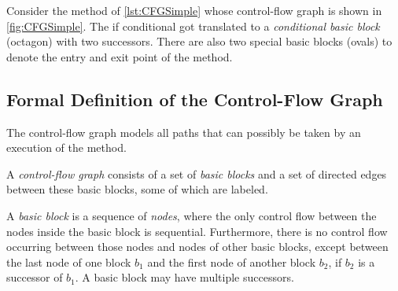
Consider the method  of \autoref{lst:CFGSimple} whose control-flow
graph is shown in \autoref{fig:CFGSimple}. The if conditional got translated to
a \emph{conditional basic block} (octagon) with two successors. There are also two
special basic blocks (ovals) to denote the entry and exit point of the method.


\subsection{Formal Definition of the Control-Flow Graph}
\label{sec:cfg-formal}

The control-flow graph models all paths that can possibly be taken by an
execution of the method.

\begin{definition}
    A \emph{control-flow graph} consists of a set of \emph{basic blocks} and
    a set of directed edges between these basic blocks, some of which are labeled.
\end{definition}

\begin{definition}
    A \emph{basic block} is a sequence of \emph{nodes}, where the only
    control flow between the nodes inside
    the basic block is sequential.  Furthermore, there is no
    control flow occurring between those nodes and nodes of other basic
    blocks, except between the last node of one block $b_1$ and the first node
    of another block $b_2$, if $b_2$ is a successor of $b_1$.  A basic
    block may have multiple successors.
\end{definition}



